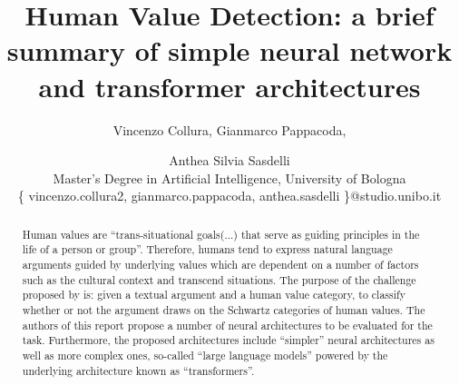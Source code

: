 \documentclass[11pt]{article}
\begin{document}
%
\title{Human Value Detection: a brief summary of simple neural network and transformer architectures\\
}
\author{Vincenzo Collura,
Gianmarco Pappacoda,
\and
Anthea Silvia Sasdelli\\
Master's Degree in Artificial Intelligence, University of Bologna\\
\{ vincenzo.collura2, gianmarco.pappacoda, anthea.sasdelli \}@studio.unibo.it
}
\maketitle



\begin{abstract}
Human values are ``trans-situational goals(...) that serve as guiding principles in the life of a person or group''\cite{Schwartz2012}. Therefore, humans tend to express natural language arguments guided by underlying values which are dependent on a number of factors such as the cultural context and transcend situations.
The purpose of the challenge proposed by \cite{Kiesel2022} is: given a textual argument and a human value category, to classify whether or not the argument draws on the Schwartz categories\cite{Schwartz2012} of human values.
The authors of this report propose a number of neural architectures to be evaluated for the task. Furthermore, the proposed architectures include ``simpler'' neural architectures as well as more complex ones, so-called ``large language models'' powered by the underlying architecture known as ``transformers''.


\end{abstract}
\end{document}
